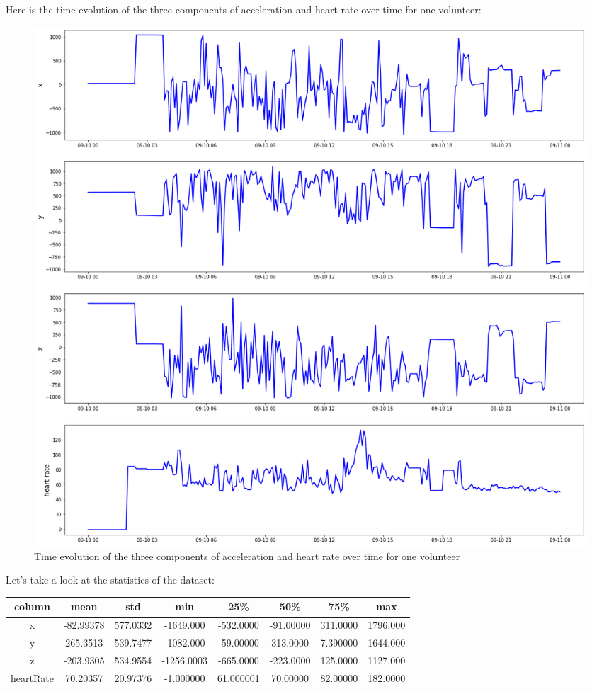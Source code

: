 Here is the time evolution of the three components of acceleration and heart rate over time for one volunteer:

\begin{figure}[H]
\centering
  \includegraphics[scale=0.3]{img/task_2/data(5min).png}
  \caption{Time evolution of the three components of acceleration and heart rate over time for one volunteer}
  \label{fig: fig: time evolution acc and hr task 2}
\end{figure}

Let's take a look at the statistics of the dataset:

\begin{center}
\begin{tabular}{| c | c | c | c | c | c | c | c |} 
\hline
column & mean & std & min & 25\% & 50\% & 75\% & max \\ [0.5ex] 
\hline
\hline
x  &	-82.99378 & 577.0332 & -1649.000  & -532.0000 & -91.00000 & 311.0000 & 1796.000 \\
\hline
y  &	265.3513 & 539.7477 & -1082.000 & -59.00000 & 313.0000 & 7.390000 & 1644.000 \\
\hline
z  &	-203.9305 & 534.9554 & -1256.0003  & -665.0000 & -223.0000  & 125.0000 & 1127.000 \\
\hline
heartRate & 70.20357 & 20.97376 & -1.000000 & 61.000001 & 70.00000 & 82.00000 & 182.0000 \\ [1ex]
\hline
\end{tabular}
\end{center}

